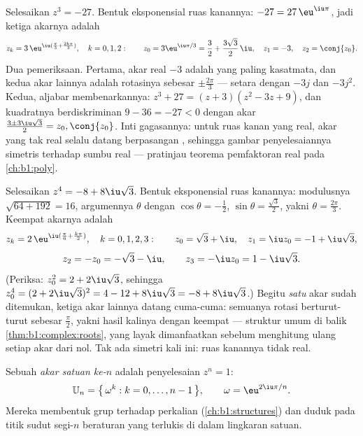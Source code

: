 \begin{example}\label{ex:b1:complex:cuberoots}
Selesaikan $z^3 = -27$. Bentuk eksponensial ruas kanannya: $-27 =
27\,\eu^{\iu\pi}$, jadi ketiga akarnya adalah
\[
z_k = 3\,\eu^{\iu(\frac\pi3 + \frac{2k\pi}3)}, \quad k = 0, 1, 2 :
\qquad
z_0 = 3\eu^{\iu\pi/3} = \frac32 + \frac{3\sqrt3}2\,\iu,
\quad
z_1 = -3,
\quad
z_2 = \conj{z_0} .
\]
Dua pemeriksaan. Pertama, akar real $-3$ adalah yang paling kasatmata, dan
kedua akar lainnya adalah rotasinya sebesar $\pm\frac{2\pi}3$ --- setara dengan
$-3j$ dan $-3j^2$. Kedua, aljabar membenarkannya: $z^3 + 27 = (z +
3)(z^2 - 3z + 9)$, dan kuadratnya berdiskriminan $9 - 36 =
-27 < 0$ dengan akar $\frac{3 \pm 3\iu\sqrt3}2 = z_0, \conj{z_0}$.
Inti gagasannya: untuk ruas kanan yang real, akar yang tak real selalu
datang berpasangan , sehingga gambar  penyelesaiannya
simetris terhadap sumbu real --- pratinjau teorema pemfaktoran
real pada \cref{ch:b1:poly}.
\end{example}

\begin{example}\label{ex:b1:complex:fourthroots}
Selesaikan $z^4 = -8 + 8\iu\sqrt3$. Bentuk eksponensial ruas kanannya:
modulusnya $\sqrt{64 + 192} = 16$, argumennya $\theta$ dengan
$\cos\theta = -\frac12$, $\sin\theta = \frac{\sqrt3}2$, yakni
$\theta = \frac{2\pi}3$. Keempat akarnya adalah
\[
z_k = 2\,\eu^{\iu(\frac\pi6 + \frac{k\pi}2)}, \quad k = 0, 1, 2,
3 :
\qquad
z_0 = \sqrt3 + \iu,\quad z_1 = \iu z_0 = -1 + \iu\sqrt3,
\]
\[
z_2 = -z_0 = -\sqrt3 - \iu,\qquad z_3 = -\iu z_0 = 1 - \iu\sqrt3 .
\]
(Periksa: $z_0^2 = 2 + 2\iu\sqrt3$, sehingga $z_0^4 = (2 +
2\iu\sqrt3)^2 = 4 - 12 + 8\iu\sqrt3 = -8 + 8\iu\sqrt3$.) Begitu
\emph{satu} akar sudah ditemukan, ketiga akar lainnya datang cuma-cuma: semuanya
rotasi berturut-turut sebesar $\frac\pi2$, yakni hasil kalinya dengan
 keempat --- struktur umum di balik
\cref{thm:b1:complex:roots}, yang layak dimanfaatkan sebelum menghitung ulang
setiap akar dari nol. Tak ada simetri  kali ini:
ruas kanannya tidak real.
\end{example}

\begin{definition}\label{def:b1:complex:unity}
Sebuah \emph{akar satuan ke-$n$} adalah
penyelesaian $z^n = 1$:
\[
\mathbb{U}_n = \bigl\{\, \omega^k : k = 0, \dots, n-1 \,\bigr\},
\qquad \omega = \eu^{2\iu\pi/n}.
\]
Mereka membentuk grup terhadap perkalian (\cref{ch:b1:structures}) dan
duduk pada titik sudut segi-$n$ beraturan yang terlukis di dalam lingkaran satuan.
\end{definition}

